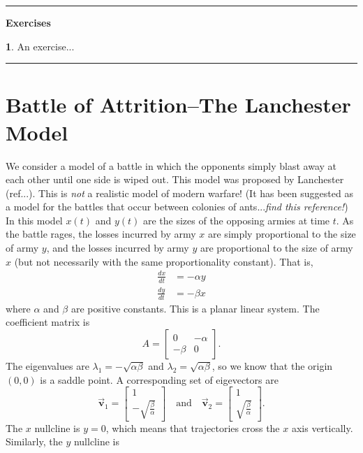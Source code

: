\documentclass[reqno]{immbook}
\newcommand{\BV}{\vec{\textbf{v}}}
\numberwithin{equation}{chapter}
\numberwithin{question}{section}
\numberwithin{theorem}{chapter}
\numberwithin{figure}{chapter}
\theoremstyle{definition}
\newtheorem{exercise}{}[section]
\newenvironment{exercises}%
{%
\medskip\hrule\medskip\noindent\textbf{Exercises}%
}%
{%
\medskip\hrule
}
\begin{document}
\begin{exercises}
\begin{exercise}
An exercise...
\end{exercise}
\end{exercises}
%
%
\section{Battle of Attrition--The Lanchester Model}
%
We consider a model of a battle in which the opponents
simply blast away at each other until one side is wiped
out.
This model was proposed by Lanchester (ref...).
This is \emph{not} a realistic model of modern warfare!
(It has been suggested as a model for the battles that
occur between colonies of ants...\emph{find this reference!})
In this model $x(t)$ and $y(t)$ are the sizes of the
opposing armies at time $t$.
As the battle rages, the losses incurred by army $x$
are simply proportional to the size of army $y$,
and the losses incurred by army $y$ are proportional
to the size of army $x$ (but not necessarily with
the same proportionality constant).
That is,
\begin{equation}
\begin{split}
   \frac{dx}{dt} & = - \alpha y \\
   \frac{dy}{dt} & = - \beta x
\end{split}
\end{equation}
where $\alpha$ and $\beta$ are positive constants.
This is a planar linear system.
The coefficient matrix is
\begin{equation}
  A = \begin{bmatrix} 0 & -\alpha \\ -\beta & 0 \end{bmatrix}.
\end{equation}
The eigenvalues are $\lambda_1 = -\sqrt{\alpha\beta}$
and $\lambda_2 = \sqrt{\alpha\beta}$,
so we know that the origin $(0,0)$ is a saddle point.
A corresponding set of eigevectors are
\[
  \BV_1 = \begin{bmatrix} 1 \\ -\sqrt{\frac{\beta}{\alpha}}\end{bmatrix}
  \quad \textrm{and}\quad
  \BV_2 = \begin{bmatrix} 1 \\ \sqrt{\frac{\beta}{\alpha}}\end{bmatrix}.
\]
The $x$ nullcline is $y=0$, which means that trajectories
cross the $x$ axis vertically. Similarly, the $y$ nullcline is
\end{document}
